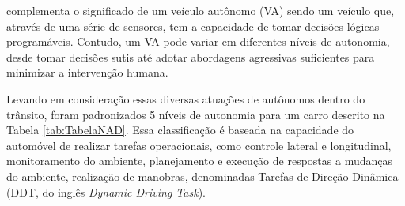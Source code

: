 \documentclass[a4paper,12pt,Times]{article}
\begin{document}
 complementa o significado de um veículo autônomo (VA) sendo um veículo que, através de uma série de sensores, tem a capacidade de tomar decisões lógicas programáveis. Contudo, um VA pode variar em diferentes níveis de autonomia, desde tomar decisões sutis até adotar abordagens agressivas suficientes para minimizar a intervenção humana.

Levando em consideração essas diversas atuações de autônomos dentro do trânsito, foram padronizados 5 níveis de autonomia para um carro descrito na Tabela \ref{tab:TabelaNAD}. Essa classificação é baseada na capacidade do automóvel de realizar tarefas operacionais, como controle lateral e longitudinal, monitoramento do ambiente, planejamento e execução de respostas a mudanças do ambiente, realização de manobras, denominadas Tarefas de Direção Dinâmica (DDT, do inglês \textit{Dynamic Driving Task}).
\end{document}
